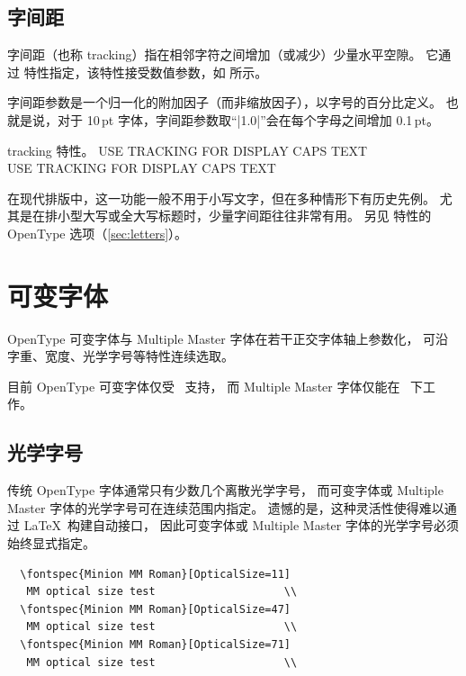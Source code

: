 \documentclass[a4paper]{l3doc}
\begin{document}
\subsection{字间距}
字间距（也称 tracking）指在相邻字符之间增加（或减少）少量水平空隙。
它通过  特性指定，该特性接受数值参数，如  所示。

字间距参数是一个归一化的附加因子（而非缩放因子），以字号的百分比定义。
也就是说，对于 10\,pt 字体，字间距参数取“|1.0|”会在每个字母之间增加 0.1\,pt。

\begin{Xexample}{tracking}{ 特性。}
  \setmainfont{Ysabeau-Light.otf}
  USE TRACKING FOR DISPLAY CAPS TEXT \\
  USE TRACKING FOR DISPLAY CAPS TEXT
\end{Xexample}

在现代排版中，这一功能一般不用于小写文字，但在多种情形下有历史先例。
尤其是在排小型大写或全大写标题时，少量字间距往往非常有用。
另见  特性的 OpenType  选项（\vref{sec:letters}）。


\section{可变字体} \label{sec:variable}

OpenType 可变字体与 Multiple Master 字体在若干正交字体轴上参数化，
可沿字重、宽度、光学字号等特性连续选取。

目前 OpenType 可变字体仅受 \LuaTeX\ 支持，
而 Multiple Master 字体仅能在 \XeTeX\ 下工作。

\subsection{光学字号} \label{sec:aat-opticalsize}

传统 OpenType 字体通常只有少数几个离散光学字号，
而可变字体或 Multiple Master 字体的光学字号可在连续范围内指定。
遗憾的是，这种灵活性使得难以通过 \LaTeX\ 构建自动接口，
因此可变字体或 Multiple Master 字体的光学字号必须始终显式指定。
\begin{Verbatim}
  \fontspec{Minion MM Roman}[OpticalSize=11]
   MM optical size test                    \\
  \fontspec{Minion MM Roman}[OpticalSize=47]
   MM optical size test                    \\
  \fontspec{Minion MM Roman}[OpticalSize=71]
   MM optical size test                    \\
\end{Verbatim}
\end{document}
